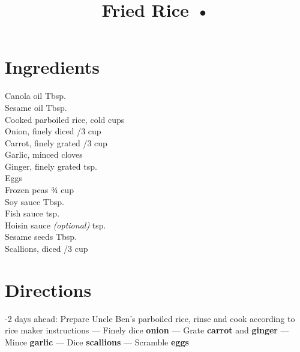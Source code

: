 \documentclass[11pt,letterpaper]{article}
\title{Fried Rice  •}
\author{}
\date{}
\begin{document}
\maketitle
\thispagestyle{empty}

\section*{Ingredients}
\setlength{\columnsep}{20pt}
\begin{multicols}{2}
\noindent
    Canola oil  Tbsp. \\
    Sesame oil  Tbsp. \\
    Cooked parboiled rice,  cold  cups \\
    Onion, finely diced /3 cup \\
    Carrot, finely grated /3 cup \\
    Garlic, minced  cloves \\
    Ginger, finely grated  tsp. \\
    Eggs  \\
    \columnbreak
    Frozen peas \dotfill ¾ cup \\
    Soy sauce  Tbsp. \\
    Fish sauce  tsp. \\
    Hoisin sauce \textit{(optional)}  tsp. \\
    Sesame seeds  Tbsp. \\
    Scallions, diced /3 cup \\
\end{multicols}

\section*{Directions}

-2 days ahead: Prepare Uncle Ben's parboiled rice, rinse and cook according to rice maker instructions ---
Finely dice \textbf{onion} ---
Grate \textbf{carrot} and \textbf{ginger} ---
Mince \textbf{garlic} ---
Dice \textbf{scallions} ---
Scramble \textbf{eggs}
\end{document}
